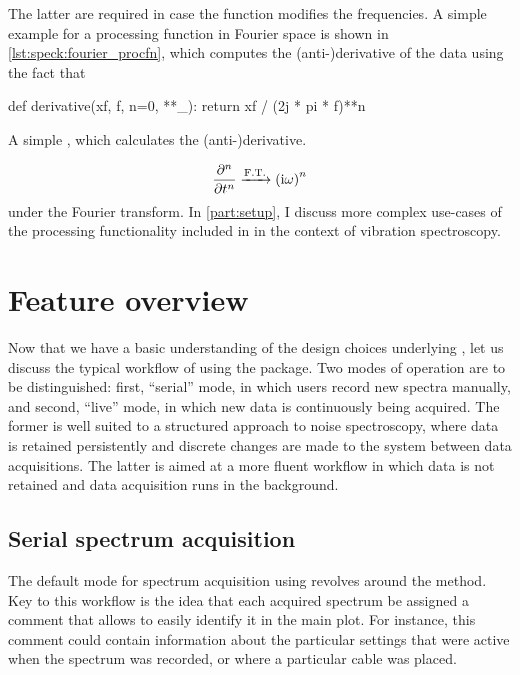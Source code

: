 The latter are required in case the function modifies the frequencies.
A simple example for a processing function in Fourier space is shown in \cref{lst:speck:fourier_procfn}, which computes the \mbox{(anti-)}derivative of the data using the fact that
\begin{marginlisting}
    \begin{py}[fontsize=\footnotesize]
        def derivative(xf, f, n=0, **_):
            return xf / (2j * pi * f)**n
    \end{py}
    \caption[Simple  example]{A simple , which calculates the \mbox{(anti-)}derivative.}
    \label{lst:speck:fourier_procfn}
\end{marginlisting}
\begin{align}\label{eq:speck:fourier_derivative}
    \pdv[n]{t} \xrightarrow{\mathrm{F.T.}} \left(\mathrm{i}\omega\right)^n
\end{align}
under the Fourier transform.
In \cref{part:setup}, I discuss more complex use-cases of the processing functionality included in \pyspeck in the context of vibration spectroscopy.

\section{Feature overview}\label{sec:speck:software:features}
Now that we have a basic understanding of the design choices underlying \pyspeck, let us discuss the typical workflow of using the package.
Two modes of operation are to be distinguished: first, \enquote{serial} mode, in which users record new spectra manually, and second, \enquote{live} mode, in which new data is continuously being acquired.
The former is well suited to a structured approach to noise spectroscopy, where data is retained persistently and discrete changes are made to the system between data acquisitions.
The latter is aimed at a more fluent workflow in which data is not retained and data acquisition runs in the background.

\subsection{Serial spectrum acquisition}\label{subsec:speck:software:features:serial}
The default mode for spectrum acquisition using \pyspeck revolves around the  method.
Key to this workflow is the idea that each acquired spectrum be assigned a comment that allows to easily identify it in the main plot.
For instance, this comment could contain information about the particular settings that were active when the spectrum was recorded, or where a particular cable was placed.


